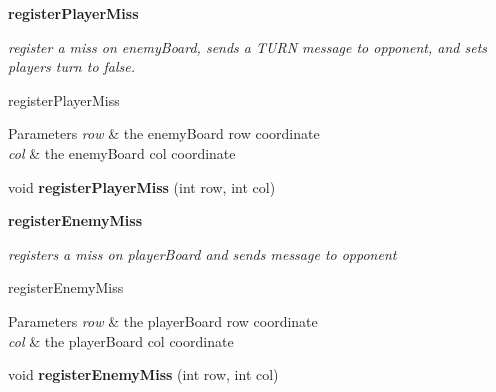 \begin{Indent}{\bf register\+Player\+Miss}\par
{\em register a miss on enemy\+Board, sends a T\+U\+R\+N message to opponent, and sets players turn to false.

register\+Player\+Miss


\begin{DoxyParams}{Parameters}
{\em row} & the enemy\+Board row coordinate \\
\hline
{\em col} & the enemy\+Board col coordinate \\
\hline
\end{DoxyParams}
}\begin{DoxyCompactItemize}
\item 
\hypertarget{classbattleship_1_1game_1_1Player_a12c31814329a78b03697e46a842b8ee5}{}void {\bfseries register\+Player\+Miss} (int row, int col)\label{classbattleship_1_1game_1_1Player_a12c31814329a78b03697e46a842b8ee5}

\end{DoxyCompactItemize}
\end{Indent}
\begin{Indent}{\bf register\+Enemy\+Miss}\par
{\em registers a miss on player\+Board and sends message to opponent

register\+Enemy\+Miss


\begin{DoxyParams}{Parameters}
{\em row} & the player\+Board row coordinate \\
\hline
{\em col} & the player\+Board col coordinate \\
\hline
\end{DoxyParams}
}\begin{DoxyCompactItemize}
\item 
\hypertarget{classbattleship_1_1game_1_1Player_a8b45bdafbb4ef6aecb7bb395faad4b3e}{}void {\bfseries register\+Enemy\+Miss} (int row, int col)\label{classbattleship_1_1game_1_1Player_a8b45bdafbb4ef6aecb7bb395faad4b3e}

\end{DoxyCompactItemize}
\end{Indent}
